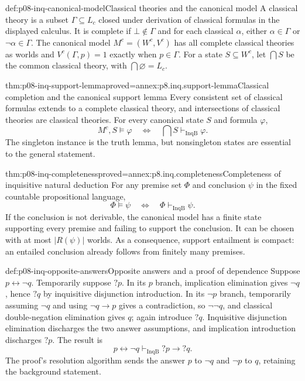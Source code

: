 \begin{hbdefinition}{def:p08-inq-canonical-model}{Classical theories and the canonical model}
A classical theory is a subset \(\Gamma\subseteq L_c\) closed under
derivation of classical formulas in the displayed calculus. It is complete
if \(\bot\notin\Gamma\) and for each classical \(\alpha\), either
\(\alpha\in\Gamma\) or \(\neg\alpha\in\Gamma\).
The canonical model \(M^c=(W^c,V^c)\) has all complete classical theories
as worlds and \(V^c(\Gamma,p)=1\) exactly when \(p\in\Gamma\).
For a state \(S\subseteq W^c\), let \(\bigcap S\) be the common classical
theory, with \(\bigcap\varnothing=L_c\).
\end{hbdefinition}

\begin{hblemma}{thm:p08-inq-support-lemma}{proved=annex:p8.inq.support-lemma}{Classical completion and the canonical support lemma}
Every consistent set of classical formulas extends to a complete classical
theory, and intersections of classical theories are classical theories.
For every canonical state \(S\) and formula \(\varphi\),
\[
 M^c,S\models\varphi
 \quad\Longleftrightarrow\quad
 \bigcap S\vdash_{\mathrm{InqB}}\varphi.
\]
The singleton instance is the truth lemma, but nonsingleton states are
essential to the general statement.
\end{hblemma}

\begin{hbtheorem}{thm:p08-inq-completeness}{proved=annex:p8.inq.completeness}{Completeness of inquisitive natural deduction}
For any premise set \(\Phi\) and conclusion \(\psi\) in the fixed
countable propositional language,
\[
 \Phi\models\psi\quad\Longleftrightarrow\quad
 \Phi\vdash_{\mathrm{InqB}}\psi.
\]
If the conclusion is not derivable, the canonical model has a finite state
supporting every premise and failing to support the conclusion. It can be
chosen with at most \(|R(\psi)|\) worlds. As a consequence, support entailment
is compact: an entailed conclusion already follows from finitely many premises.
\end{hbtheorem}

\begin{hbexample}{def:p08-inq-opposite-answers}{Opposite answers and a proof of dependence}
Suppose \(p\leftrightarrow\neg q\). Temporarily suppose \(?p\).
In its \(p\) branch, implication elimination gives \(\neg q\), hence \(?q\)
by inquisitive disjunction introduction. In its \(\neg p\) branch,
temporarily assuming \(\neg q\) and using \(\neg q\to p\) gives a
contradiction, so \(\neg\neg q\), and classical double-negation elimination
gives \(q\); again introduce \(?q\). Inquisitive disjunction elimination
discharges the two answer assumptions, and implication introduction
discharges \(?p\). The result is
\[
 p\leftrightarrow\neg q\vdash_{\mathrm{InqB}}?p\to?q.
\]
The proof's resolution algorithm sends the answer \(p\) to \(\neg q\)
and \(\neg p\) to \(q\), retaining the background statement.
\end{hbexample}

